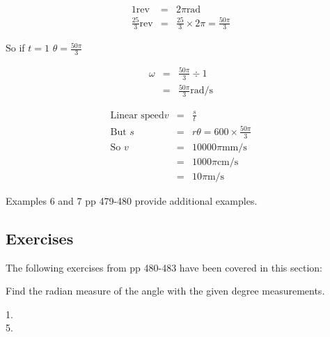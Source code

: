 \begin{align*}1\text{rev} &  = & 2 \pi \text{rad} \\
\frac{25}{3}\text{rev} &  = & \frac{25}{3} \times 2 \pi  =\frac{50 \pi }{3}\end{align*}

So if $t =1$ $\theta  =\frac{50 \pi }{3}$ 


\begin{align*}\omega  &  = & \frac{50 \pi }{3} \div 1 \\
 &  = & \frac{50 \pi }{3}\text{rad/}\mbox{s}\end{align*}


\begin{align*}\text{Linear speed}v &  = & \frac{s}{t} \\
\text{But\ \ \ }s &  = & r \theta  =600 \times \frac{50 \pi }{3} \\
\text{So\ \ \ }v &  = & 10000 \pi \text{}\mbox{mm}\text{/}\mbox{s} \\
 &  = & 1000 \pi \text{}\mbox{cm}\text{/}\mbox{s} \\
 &  = & 10 \pi \text{}\mbox{m}\text{/}\mbox{s}\end{align*}

Examples 6 and 7 pp 479-480 provide additional examples. 

\subsection{Exercises}
The following exercises from pp 480-483 have been covered in this section: 

Find the radian measure of the angle with the given degree measurements. 


\begin{description}
\item [1.]   
\columnsep =30pt
 

\item [5.]
\columnsep =30pt
 \end{description}

